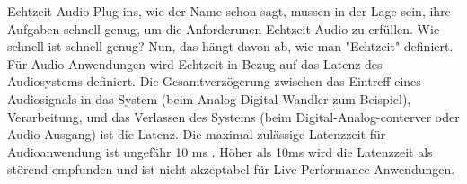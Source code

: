 Echtzeit Audio Plug-ins, wie der Name schon sagt, mussen in der Lage sein, ihre Aufgaben schnell genug, um die Anforderunen Echtzeit-Audio zu erfüllen. Wie schnell ist schnell genug? Nun, das hängt davon ab, wie man "Echtzeit" definiert. Für Audio Anwendungen wird Echtzeit in Bezug auf das Latenz des Audiosystems definiert. Die Gesamtverzögerung zwischen das Eintreff eines Audiosignals in das System (beim Analog-Digital-Wandler zum Beispiel), Verarbeitung, und das Verlassen des Systems (beim Digital-Analog-conterver oder Audio Ausgang) ist die Latenz. Die maximal zulässige Latenzzeit für Audioanwendung ist ungefähr 10 ms \cite{AES67-2013}. Höher als 10ms wird die Latenzzeit als störend empfunden und ist nicht akzeptabel für Live-Performance-Anwendungen.
